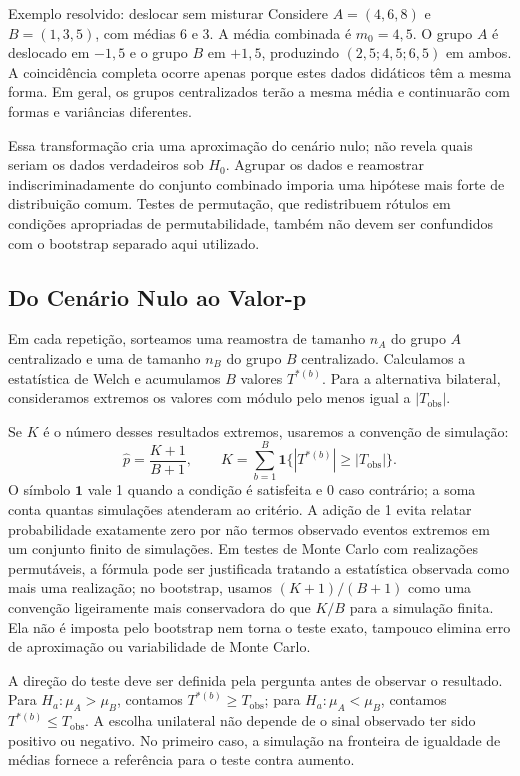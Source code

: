 \documentclass[12pt,a4paper]{article}
\begin{document}
\begin{exemplobox}{Exemplo resolvido: deslocar sem misturar}
Considere $A=(4,6,8)$ e $B=(1,3,5)$, com médias 6 e 3. A média combinada é $m_0=4{,}5$. O grupo $A$ é deslocado em $-1{,}5$ e o grupo $B$ em $+1{,}5$, produzindo $(2{,}5;4{,}5;6{,}5)$ em ambos. A coincidência completa ocorre apenas porque estes dados didáticos têm a mesma forma. Em geral, os grupos centralizados terão a mesma média e continuarão com formas e variâncias diferentes.
\end{exemplobox}

Essa transformação cria uma aproximação do cenário nulo; não revela quais seriam os dados verdadeiros sob $H_0$. Agrupar os dados e reamostrar indiscriminadamente do conjunto combinado imporia uma hipótese mais forte de distribuição comum. Testes de permutação, que redistribuem rótulos em condições apropriadas de permutabilidade, também não devem ser confundidos com o bootstrap separado aqui utilizado.

\subsection{Do Cenário Nulo ao Valor-p}
Em cada repetição, sorteamos uma reamostra de tamanho $n_A$ do grupo $A$ centralizado e uma de tamanho $n_B$ do grupo $B$ centralizado. Calculamos a estatística de Welch e acumulamos $B$ valores $T^{*(b)}$. Para a alternativa bilateral, consideramos extremos os valores com módulo pelo menos igual a $|T_{\mathrm{obs}}|$.

Se $K$ é o número desses resultados extremos, usaremos a convenção de simulação:
\[
\hat p=\frac{K+1}{B+1},\qquad
K=\sum_{b=1}^B\mathbf{1}\{|T^{*(b)}|\geq|T_{\mathrm{obs}}|\}.
\]
O símbolo $\mathbf{1}$ vale 1 quando a condição é satisfeita e 0 caso contrário; a soma conta quantas simulações atenderam ao critério. A adição de 1 evita relatar probabilidade exatamente zero por não termos observado eventos extremos em um conjunto finito de simulações. Em testes de Monte Carlo com realizações permutáveis, a fórmula pode ser justificada tratando a estatística observada como mais uma realização; no bootstrap, usamos $(K+1)/(B+1)$ como uma convenção ligeiramente mais conservadora do que $K/B$ para a simulação finita. Ela não é imposta pelo bootstrap nem torna o teste exato, tampouco elimina erro de aproximação ou variabilidade de Monte Carlo.

A direção do teste deve ser definida pela pergunta antes de observar o resultado. Para $H_a:\mu_A>\mu_B$, contamos $T^{*(b)}\geq T_{\mathrm{obs}}$; para $H_a:\mu_A<\mu_B$, contamos $T^{*(b)}\leq T_{\mathrm{obs}}$. A escolha unilateral não depende de o sinal observado ter sido positivo ou negativo. No primeiro caso, a simulação na fronteira de igualdade de médias fornece a referência para o teste contra aumento.
\end{document}
